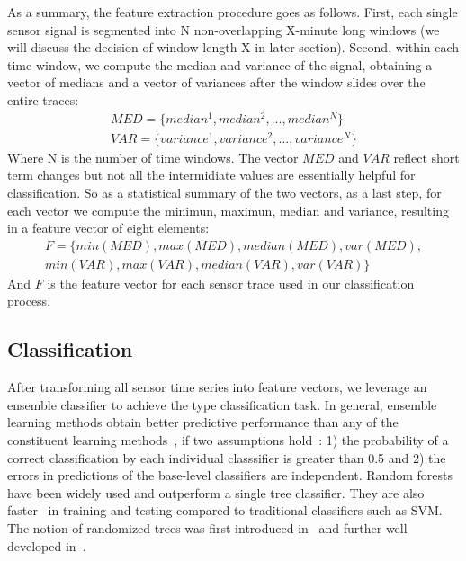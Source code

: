 As a summary, the feature extraction procedure goes as follows. First, each single sensor signal is segmented into N
non-overlapping X-minute long windows (we will discuss the decision of window length X in later section). Second, within
each time window, we compute the median and variance of the signal, obtaining a vector of medians and a vector of
variances after the window slides over the entire traces: 
\begin{displaymath}
\begin{split}
MED = \{median^{1}, median^{2}, ..., median^{N}\}\\
VAR = \{variance^{1}, variance^{2}, ..., variance^{N}\}
\end{split}
\end{displaymath}
Where N is the number of time windows. The vector $MED$ and $VAR$ reflect short term changes but not all the intermidiate values are essentially helpful for classification. So as a statistical summary of the two vectors, as a last step, for each vector we compute the minimun, maximun, median and variance, resulting in a feature vector of eight elements:
\begin{displaymath}
\begin{split}
F = \{min(MED), max(MED), median(MED), var(MED),\\
 min(VAR), max(VAR), median(VAR), var(VAR)\}
\end{split}
\end{displaymath}
And $F$ is the feature vector for each sensor trace used in our classification process.

\subsection{Classification}
After transforming all sensor time series into feature vectors, we leverage an ensemble classifier to achieve 
the type classification task. In general, ensemble learning methods obtain better predictive performance than
 any of the constituent learning methods~\cite{ensem1,ensem2}, if two assumptions hold~\cite{ensem3}: 1) the 
 probability of a correct classification by each individual classsifier is greater than 0.5 and 2) the errors
  in predictions of the base-level classifiers are independent. Random forests~\cite{RF} have been widely used 
  and outperform a single tree classifier. They are also faster~\cite{cvpr} in training and testing compared to traditional classifiers such as SVM. The notion of randomized trees was first introduced in~\cite{RT} and further well developed in~\cite{RF}.

